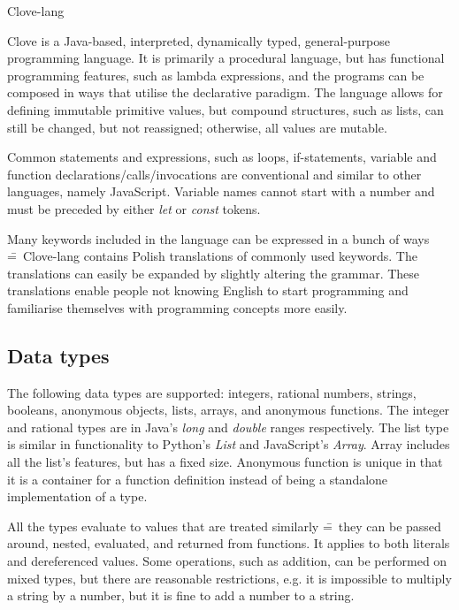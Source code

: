 \documentclass[12pt,a4paper]{article}
\begin{document}
\begin{center}
  \Huge {Clove-lang}
\end{center}

\noindent Clove is a Java-based, interpreted, dynamically typed, general-purpose programming language. It is primarily a procedural language, but has functional programming features, such as lambda expressions, and the programs can be composed in ways that utilise the declarative paradigm. The language allows for defining immutable primitive values, but compound structures, such as lists, can still be changed, but not reassigned; otherwise, all values are mutable.\par

Common statements and expressions, such as loops, if-statements, variable and function declarations/calls/invocations are conventional and similar to other languages, namely JavaScript. Variable names cannot start with a number and must be preceded by either \emph{let} or \emph{const} tokens.\par

Many keywords included in the language can be expressed in a bunch of ways \==~Clove-lang contains Polish translations of commonly used keywords. The translations can easily be expanded by slightly altering the grammar. These translations enable people not knowing English to start programming and familiarise themselves with programming concepts more easily.



\vspace{-0.25em}
\subsection*{Data types}
The following data types are supported: integers, rational numbers, strings, booleans, anonymous objects, lists, arrays, and anonymous functions. The integer and rational types are in Java's \emph{long} and \emph{double} ranges respectively. The list type is similar in functionality to Python's \emph{List} and JavaScript's \emph{Array}. Array includes all the list's features, but has a fixed size. Anonymous function is unique in that it is a container for a function definition instead of being a standalone implementation of a type.\par

All the types evaluate to values that are treated similarly \==~they can be passed around, nested, evaluated, and returned from functions. It applies to both literals and dereferenced values. Some operations, such as addition, can be performed on mixed types, but there are reasonable restrictions, e.g. it is impossible to multiply a string by a number, but it is fine to add a number to a string.
\end{document}
